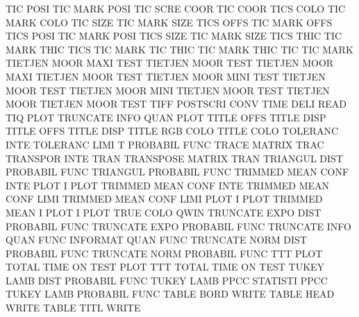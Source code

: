TIC      POSI                           TIC      MARK POSI
TIC      SCRE COOR                      TIC      COOR
TICS     COLO                           TIC      MARK COLO
TIC      SIZE                           TIC      MARK SIZE
TICS     OFFS                           TIC      MARK OFFS
TICS     POSI                           TIC      MARK POSI
TICS     SIZE                           TIC      MARK SIZE
TICS     THIC                           TIC      MARK THIC
TICS                                    TIC      MARK
TIC      THIC                           TIC      MARK THIC
TIC                                     TIC      MARK
TIETJEN  MOOR MAXI TEST                 TIETJEN  MOOR TEST
TIETJEN  MOOR MAXI                      TIETJEN  MOOR TEST
TIETJEN  MOOR MINI TEST                 TIETJEN  MOOR TEST
TIETJEN  MOOR MINI                      TIETJEN  MOOR TEST
TIETJEN  MOOR                           TIETJEN  MOOR TEST
TIFF                                    POSTSCRI CONV
TIME     DELI                           READ
TIQ      PLOT                           TRUNCATE INFO QUAN PLOT
TITLE    OFFS                           TITLE    DISP
TITLE    OFFS                           TITLE    DISP
TITLE    RGB  COLO                      TITLE    COLO
TOLERANC INTE                           TOLERANC LIMI
T                                       PROBABIL FUNC
TRACE                                   MATRIX   TRAC
TRANSPOR INTE                           TRAN
TRANSPOSE                               MATRIX   TRAN
TRIANGUL DIST                           PROBABIL FUNC
TRIANGUL                                PROBABIL FUNC
TRIMMED  MEAN CONF INTE PLOT            I        PLOT
TRIMMED  MEAN CONF INTE                 TRIMMED  MEAN CONF LIMI
TRIMMED  MEAN CONF LIMI PLOT            I        PLOT
TRIMMED  MEAN I    PLOT                 I        PLOT
TRUE     COLO                           QWIN
TRUNCATE EXPO DIST                      PROBABIL FUNC
TRUNCATE EXPO                           PROBABIL FUNC
TRUNCATE INFO QUAN FUNC                 INFORMAT QUAN FUNC
TRUNCATE NORM DIST                      PROBABIL FUNC
TRUNCATE NORM                           PROBABIL FUNC
TTT      PLOT                           TOTAL    TIME ON   TEST PLOT
TTT                                     TOTAL    TIME ON   TEST
TUKEY    LAMB DIST                      PROBABIL FUNC
TUKEY    LAMB PPCC                      STATISTI PPCC
TUKEY    LAMB                           PROBABIL FUNC
TABLE    BORD                           WRITE
TABLE    HEAD                           WRITE
TABLE    TITL                           WRITE
